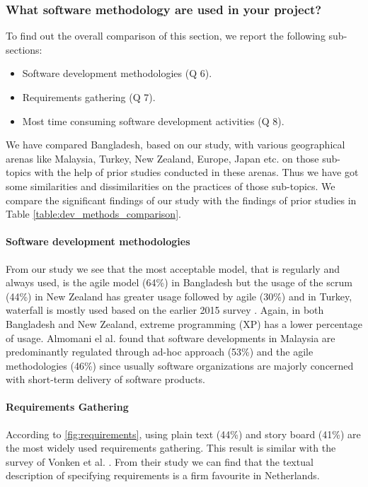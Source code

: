 \subsubsection{What software methodology are used in your project?}

To find out the overall comparison of this section, we report the following sub-sections:

\begin{itemize}
\item Software development methodologies (Q 6).
\item Requirements gathering (Q 7).
\item Most time consuming software development activities (Q 8).
\end{itemize}



We have compared Bangladesh, based on our study, with various geographical arenas like Malaysia, Turkey, New Zealand, Europe, Japan etc. on those sub-topics with the help of prior studies conducted in these arenas. Thus we have got some similarities and dissimilarities on the practices of those sub-topics. We compare the significant findings of our study with the findings of prior studies in Table \ref{table:dev_methods_comparison}.


\paragraph{Software development methodologies}
From our study we see that the most acceptable model, that is regularly and always used, is the agile model (64\%) in Bangladesh but the usage of the scrum (44\%) in New Zealand has greater usage followed by agile (30\%) \cite{Wang2018} and in Turkey, waterfall is mostly used based on the earlier 2015 survey \cite{Garousi2015}. Again, in both Bangladesh and New Zealand, extreme programming (XP) has a lower percentage of usage. Almomani el al. \cite{Almomani2015} found that software developments in Malaysia are predominantly regulated through ad-hoc approach (53\%) and the agile methodologies (46\%) since usually software organizations are majorly concerned with short-term delivery of software products.


\paragraph{Requirements Gathering}
According to \ref{fig:requirements}, using plain text (44\%) and story board (41\%) are the most widely used requirements gathering. This result is similar with the survey of Vonken et al. \cite{Vonken2012}. From their study we can find that the textual description of specifying requirements is a firm favourite in Netherlands.


